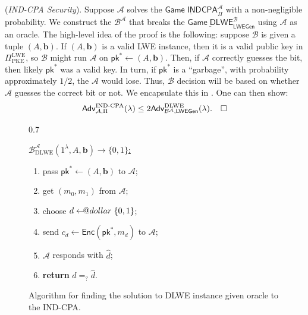 \documentclass{template}
\makeatletter
\newcommand{\qedwhite}{\hfill \ensuremath{\Box}}
\newcommand\leftarrowS{\leftarrow\joinrel\smalldollar}
\newcommand{\smalldollar}{\mathrel{\mathpalette\small@dollar\relax}}
\newcommand{\small@dollar}[2]{%
  \vcenter{\hbox{%
    $#1\textnormal{\fontsize{0.7\dimexpr\f@size pt}{0}\selectfont\$}$%
  }}%
}
\makeatother
\begin{document}
(\textit{IND-CPA Security}). Suppose $\mathcal{A}$ solves the
$\underline{\mathsf{Game} \; \mathsf{INDCPA}}_{\Pi}^{\mathcal{A}}$ with a
non-negligible probability. We construct the $\mathcal{B}^{\mathcal{A}}$ that
breaks the $\underline{\mathsf{Game} \;
\mathsf{DLWE}}_{\mathsf{LWEGen}}^{\mathcal{B}}$ using $\mathcal{A}$ as an
oracle. The high-level idea of the proof is the following: suppose $\mathcal{B}$
is given a tuple $(A,\mathbf{b})$. If $(A,\mathbf{b})$ is a valid LWE instance,
then it is a valid public key in $\Pi_{\text{PKE}}^{\text{LWE}}$, so
$\mathcal{B}$ might run $\mathcal{A}$ on $\mathsf{pk}^* \gets (A,\mathbf{b})$.
Then, if $\mathcal{A}$ correctly guesses the bit, then likely $\mathsf{pk}^*$
was a valid key. In turn, if $\mathsf{pk}^*$ is a ``garbage'', with probability
approximately $1/2$, the $\mathcal{A}$ would lose. Thus, $\mathcal{B}$ decision
will be based on whether $\mathcal{A}$ guesses the correct bit or not. We
encapsulate this in . One can then show:
\begin{equation*}
    \mathsf{Adv}^{\text{IND-CPA}}_{\mathcal{A},\Pi}(\lambda) \leq 2\mathsf{Adv}^{\text{DLWE}}_{\mathcal{B}^{\mathcal{A}},\mathsf{LWEGen}}(\lambda). 
    \quad \qedwhite
\end{equation*}

\begin{figure}[ht]
\centering
\begin{varwidth}{0.7\linewidth}
\begin{mdframed}[linecolor=black,
                 linewidth=1.0pt,
                 skipabove=10pt,
                 skipbelow=10pt,
                 leftmargin=0pt,
                 rightmargin=0pt]
\colorbox{purple!10}{\underline{$\mathcal{B}^{\mathcal{A}}_{\text{DLWE}}(1^{\lambda}, A, \mathbf{b}) \to \{0,1\}$:}}
\begin{enumerate}
    \item pass $\mathsf{pk}^* \gets (A,\mathbf{b})$ to $\mathcal{A}$;
    \item get $(m_0,m_1)$ from $\mathcal{A}$; 
    \item choose $d \leftarrowS \{0,1\}$;
    \item send $c_d \gets \mathsf{Enc}(\mathsf{pk}^*, m_d)$ to $\mathcal{A}$;
    \item $\mathcal{A}$ responds with $\widehat{d}$;
    \item \textbf{return} $d =_? \widehat{d}$. 
\end{enumerate}
\end{mdframed}
\end{varwidth}
\caption{Algorithm for finding the solution to DLWE instance given oracle to the IND-CPA.}
\label{fig:ind-cpa-to-dlwe}
\end{figure}
\end{document}
